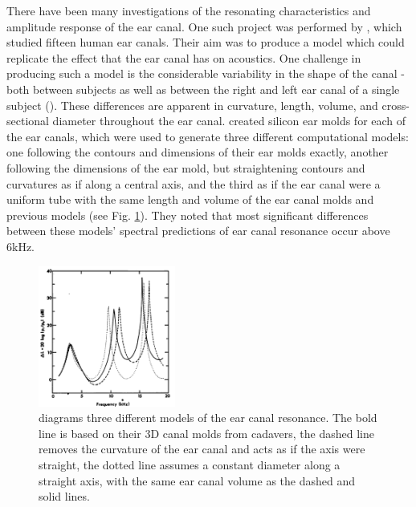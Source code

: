There have been many investigations of the resonating characteristics and amplitude response of the ear canal.  One such project was performed by \cite{stinson:89}, which studied fifteen human ear canals.  Their aim was to produce a model which could replicate the effect that the ear canal has on acoustics.
One challenge in producing such a model is the considerable variability in the shape of the canal - both between subjects as well as between the right and left ear canal of a single subject (\cite{stinson:89}).  These differences are apparent in curvature, length, volume, and cross-sectional diameter throughout the ear canal.  \cite{stinson:89} created silicon ear molds for each of the ear canals, which were used to generate three different computational models: one following the contours and dimensions of their ear molds exactly, another following the dimensions of the ear mold, but straightening contours and curvatures as if along a central axis, and the third as if the ear canal were a uniform tube with the same length and volume of the ear canal molds and previous models (see Fig. \ref{fig:eac_modelling}).  They noted that most significant differences between these models' spectral predictions of ear canal resonance occur above 6kHz.

%
\begin{figure}[h!]
\centering
  \includegraphics[width=0.4\textwidth]{figure/eac_mod_diffs.png}
  \caption{\cite{stinson:89} diagrams three different models of the ear canal resonance.  The bold line is based on their 3D canal molds from cadavers, the dashed line removes the curvature of the ear canal and acts as if the axis were straight, the dotted line assumes a constant diameter along a straight axis, with the same ear canal volume as the dashed and solid lines.}
  \label{fig:eac_modelling}
\end{figure}
%

